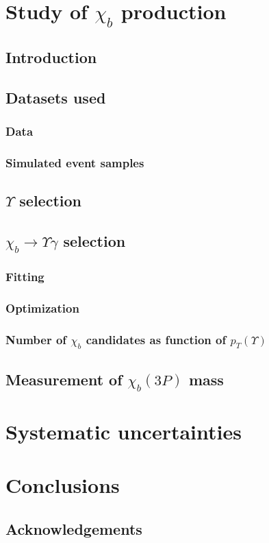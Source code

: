 \documentclass[12pt,a4paper]{report}
\begin{document}
\chapter{Study of $\chi_{b}$ production}
\section{Introduction}
\section{Datasets used}
\subsection{Data}
\subsection{Simulated event samples}
\section{$\Upsilon$ selection}
\section{$\chi_{b} \rightarrow \Upsilon \gamma$ selection}
\subsection{Fitting}
\subsection{Optimization}
\subsection{Number of $\chi_{b}$ candidates as function of $p_{T} (\Upsilon)$}

\section{Measurement of $\chi_{b} (3P)$ mass}

\chapter{Systematic uncertainties}
\chapter{Conclusions}

\section*{Acknowledgements}

\renewcommand{\bibname}{References}%



\end{document}
